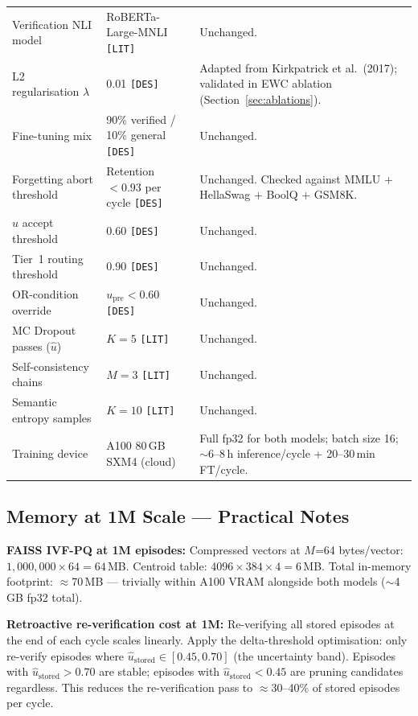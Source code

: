 \documentclass[12pt,a4paper]{article}
\newcommand{\upre}{u_{\text{pre}}}
\newcommand{\uhat}{\hat{u}}
\newcommand{\ustored}{\hat{u}_{\text{stored}}}
\begin{document}
\begin{table}[htbp]
\begin{tabular}{@{}p{5.0cm}p{3.5cm}p{5.0cm}@{}}
Verification NLI model & RoBERTa-Large-MNLI \texttt{[LIT]} & Unchanged. \\
L2 regularisation $\lambda$ & 0.01 \texttt{[DES]} &
  Adapted from Kirkpatrick et al.\ (2017); validated in EWC ablation
  (Section~\ref{sec:ablations}). \\
Fine-tuning mix & 90\% verified / 10\% general \texttt{[DES]} & Unchanged. \\
Forgetting abort threshold & Retention $< 0.93$ per cycle \texttt{[DES]} &
  Unchanged. Checked against MMLU + HellaSwag + BoolQ + GSM8K. \\
$\uhat$ accept threshold & 0.60 \texttt{[DES]} & Unchanged. \\
Tier~1 routing threshold & 0.90 \texttt{[DES]} & Unchanged. \\
OR-condition override & $\upre < 0.60$ \texttt{[DES]} & Unchanged. \\
MC Dropout passes ($\uhat$) & $K=5$ \texttt{[LIT]} & Unchanged. \\
Self-consistency chains & $M=3$ \texttt{[LIT]} & Unchanged. \\
Semantic entropy samples & $K=10$ \texttt{[LIT]} & Unchanged. \\
Training device & A100 80\,GB SXM4 (cloud) & Full fp32 for both models;
  batch size 16; $\sim$6--8\,h inference/cycle + 20--30\,min FT/cycle. \\
\bottomrule
\end{tabular}
\end{table}

\subsection{Memory at 1M Scale --- Practical Notes}

\textbf{FAISS IVF-PQ at 1M episodes:}
Compressed vectors at $M$=64 bytes/vector: $1{,}000{,}000 \times 64 = 64$\,MB.
Centroid table: $4096 \times 384 \times 4 = 6$\,MB.
Total in-memory footprint: $\approx$70\,MB --- trivially within A100 VRAM
alongside both models ($\sim$4\,GB fp32 total).

\textbf{Retroactive re-verification cost at 1M:}
Re-verifying all stored episodes at the end of each cycle scales linearly.
Apply the delta-threshold optimisation: only re-verify episodes where
$\ustored \in [0.45, 0.70]$ (the uncertainty band).
Episodes with $\ustored > 0.70$ are stable; episodes with $\ustored < 0.45$
are pruning candidates regardless.
This reduces the re-verification pass to $\approx$30--40\% of stored episodes
per cycle.
\end{document}
